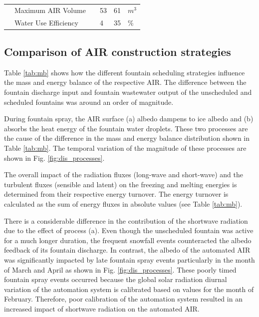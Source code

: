 \documentclass[tc, manuscript]{copernicus}
\begin{document}
\begin{table}
\begin{tabular}{@{}|llllll|@{}}
		                       & Maximum AIR Volume              &                 & 53            & 61            & $m^{3}$ \\
		\multicolumn{1}{|l|}{} & Water Use Efficiency            &                 & 4             & 35            & \% \\\midrule
	\end{tabular}
\end{table}

\subsection{Comparison of AIR construction strategies}

Table \ref{tab:mb} shows how the different fountain scheduling strategies influence the mass and energy balance
of the respective AIR. The difference between the fountain discharge input and fountain wastewater output of the
unscheduled and scheduled fountains was around an order of magnitude. 

During fountain spray, the AIR surface (a) albedo dampens to ice albedo and (b) absorbs the heat energy of the
fountain water droplets. These two processes are the cause of the difference in the mass and energy balance
distribution shown in Table \ref{tab:mb}. The temporal variation of the magnitude of these processes are shown
in Fig. \ref{fig:dis_processes}.

The overall impact of the radiation fluxes (long-wave and short-wave) and the turbulent fluxes (sensible and
latent) on the freezing and melting energies is determined from their respective energy turnover. The energy
turnover is calculated as the sum of energy fluxes in absolute values (see Table \ref{tab:mb}). 

There is a considerable difference in the contribution of the shortwave radiation due to the effect of process
(a). Even though the unscheduled fountain was active for a much longer duration, the frequent snowfall events
counteracted the albedo feedback of its fountain discharge. In contrast, the albedo of the automated AIR was
significantly impacted by late fountain spray events particularly in the month of March and April as shown in
Fig. \ref{fig:dis_processes}. These poorly timed fountain spray events occurred because the global solar
radiation diurnal variation of the automation system is calibrated based on values for the month of February.
Therefore, poor calibration of the automation system resulted in an increased impact of shortwave radiation on
the automated AIR.
\end{document}
